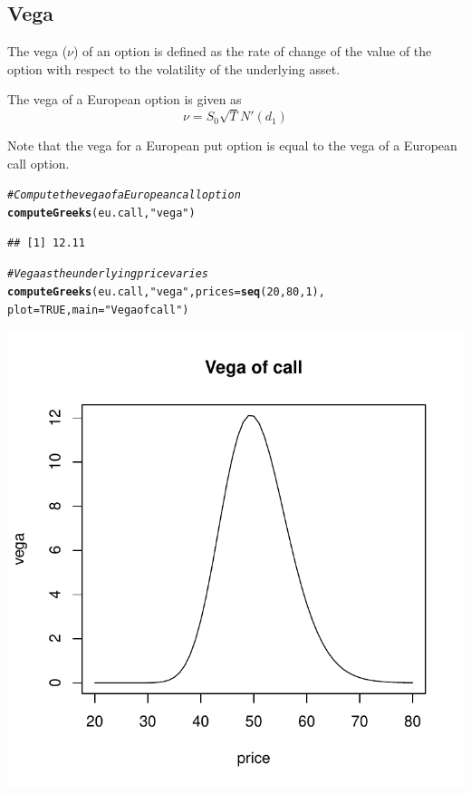 \documentclass{article}\usepackage[]{graphicx}\usepackage[]{color}
\makeatletter
\def\maxwidth{ %
  \ifdim\Gin@nat@width>\linewidth
    \linewidth
  \else
    \Gin@nat@width
  \fi
}
\newcommand{\hlstr}[1]{\textcolor[rgb]{0.192,0.494,0.8}{#1}}%
\newcommand{\hlcom}[1]{\textcolor[rgb]{0.678,0.584,0.686}{\textit{#1}}}%
\newcommand{\hlkwd}[1]{\textcolor[rgb]{0.737,0.353,0.396}{\textbf{#1}}}%
\newenvironment{kframe}{%
 \def\at@end@of@kframe{}%
 \ifinner\ifhmode%
  \def\at@end@of@kframe{\end{minipage}}%
  \begin{minipage}{\columnwidth}%
 \fi\fi%
 \def\FrameCommand##1{\hskip\@totalleftmargin \hskip-\fboxsep
 \colorbox{shadecolor}{##1}\hskip-\fboxsep
     \hskip-\linewidth \hskip-\@totalleftmargin \hskip\columnwidth}%
 \MakeFramed {\advance\hsize-\width
   \@totalleftmargin\z@ \linewidth\hsize
   \@setminipage}}%
 {\par\unskip\endMakeFramed%
 \at@end@of@kframe}
\newenvironment{knitrout}{}{} %
\makeatother
\begin{document}
\subsection{Vega}
The vega ($\nu$) of an option is defined as the rate of change of the value of the option with respect to the volatility of the underlying asset.

The vega of a European option is given as
\begin{equation*}
\nu = S_0 \sqrt{T} N'(d_1)
\end{equation*}

Note that the vega for a European put option is equal to the vega of a European call option.

\begin{knitrout}
\color{fgcolor}\begin{kframe}
\begin{alltt}
\hlcom{# Compute the vega of a European call option}
\hlkwd{computeGreeks}(eu.call, \hlstr{"vega"})
\end{alltt}
\begin{verbatim}
## [1] 12.11
\end{verbatim}
\end{kframe}
\end{knitrout}


\begin{knitrout}
\color{fgcolor}\begin{kframe}
\begin{alltt}
\hlcom{# Vega as the underlying price varies}
\hlkwd{computeGreeks}(eu.call, \hlstr{"vega"}, prices = \hlkwd{seq}(20, 80, 1), 
              plot = TRUE, main=\hlstr{"Vega of call"})
\end{alltt}
\end{kframe}
\includegraphics[width=\maxwidth]{figure/unnamed-chunk-19} 

\end{knitrout}
\end{document}
